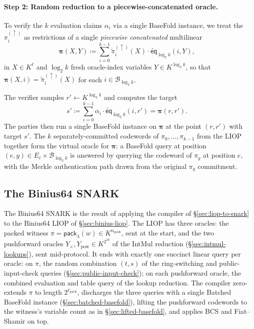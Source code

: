 \documentclass{article}
\theoremstyle{definition}
\newcommand*{\mle}{\widetilde}
\newcommand{\eq}{\mathsf{eq}}
\newcommand{\BB}{\mathcal{B}}
\begin{document}
\paragraph{Step 2: Random reduction to a piecewise-concatenated oracle.}
To verify the $k$ evaluation claims $\alpha_i$ via a single BaseFold instance, we treat the $\pi_i^{(\uparrow)}$ as restrictions of a single \emph{piecewise concatenated} multilinear
\[
  \boldsymbol{\pi}(X, Y) \coloneqq \sum_{i = 0}^{k - 1} \mle{\pi}_i^{(\uparrow)}(X) \cdot \mle{\eq}_{\log_2 k}(i, Y),
\]
in $X \in K^{\boldsymbol{\ell}}$ and $\log_2 k$ fresh oracle-index variables $Y \in K^{\log_2 k}$, so that $\boldsymbol{\pi}(X, i) = \mle{\pi}_i^{(\uparrow)}(X)$ for each $i \in \BB_{\log_2 k}$.

The verifier samples $r' \gets K^{\log_2 k}$ and computes the target
\[
  s' \coloneqq \sum_{i = 0}^{k - 1} \alpha_i \cdot \mle{\eq}_{\log_2 k}(i, r') = \boldsymbol{\pi}(r, r').
\]
The parties then run a single BaseFold instance on $\boldsymbol{\pi}$ at the point $(r, r')$ with target $s'$. The $k$ separately-committed codewords of $\pi_0, \ldots, \pi_{k - 1}$ from the LIOP together form the virtual oracle for $\boldsymbol{\pi}$: a BaseFold query at position $(e, y) \in E_{\boldsymbol{\ell}} \times \BB_{\log_2 k}$ is answered by querying the codeword of $\pi_y$ at position $e$, with the Merkle authentication path drawn from the original $\pi_y$ commitment.

\subsection{The Binius64 SNARK}
\label{sec:binius64-snark}

The Binius64 SNARK is the result of applying the compiler of \S\ref{sec:liop-to-snark} to the Binius64 LIOP of \S\ref{sec:binius-liop}. The LIOP has three oracles: the packed witness $\pi = \textsf{pack}_\lambda(w) \in K^{n_\text{pack}}$, sent at the start, and the two pushforward oracles $Y_\times, Y_\text{pow} \in K^{2^{16}}$ of the IntMul reduction (\S\ref{sec:intmul-lookups}), sent mid-protocol. It ends with exactly one succinct linear query per oracle: on $\pi$, the random combination $(t, s)$ of the ring-switching and public-input-check queries (\S\ref{sec:public-input-check}); on each pushforward oracle, the combined evaluation and table query of the lookup reduction. The compiler zero-extends $\pi$ to length $2^{\ell_\text{pack}}$, discharges the three queries with a single Batched BaseFold instance (\S\ref{sec:batched-basefold}), lifting the pushforward codewords to the witness's variable count as in \S\ref{sec:lifted-basefold}, and applies BCS and Fiat--Shamir on top.
\end{document}
